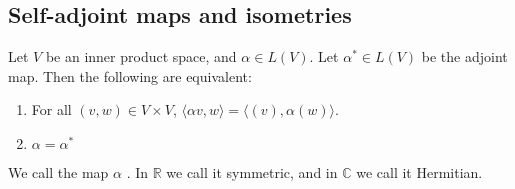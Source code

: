 \documentclass[a4paper]{scrartcl}
\begin{document}
\subsection{Self-adjoint maps and isometries}

\begin{proposition}
      Let $V$ be an inner product space, and $\alpha \in L (V)$. Let $\alpha^* \in L (V)$ be the adjoint map. Then the following are equivalent:
      \begin{enumerate}
           \item For all $(v,w) \in V \times V$, $\langle \alpha v,w \rangle =\langle (v),\alpha (w) \rangle $.
           \item $\alpha=\alpha^*$
      \end{enumerate}
      We call the map $\alpha$ . In $\mathbb{R}$ we call it symmetric, and in $\mathbb{C}$ we call it Hermitian.   
\end{proposition}
\end{document}
